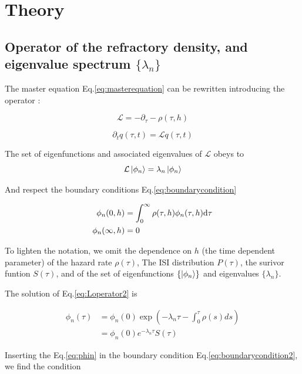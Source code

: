 \documentclass[a4paper,11pt,twoside]{article}
\def \dd  {{\rm d}}
\numberwithin{equation}{section}
\begin{document}
\section{Theory}
\label{sec:theory}
\subsection{Operator of the refractory density, and eigenvalue spectrum $\{\lambda_n\}$}

The master equation Eq.\eqref{eq:masterequation} can be rewritten introducing the operator :

\begin{equation}
\label{eq:Loperator}
\mathcal{L}=-\partial_\tau-\rho(\tau,h)
\end{equation}

\begin{equation}
\label{eq:masterequation2}
\partial_t q(\tau,t)=\mathcal{L}q(\tau,t)
\end{equation}

The set of eigenfunctions and associated eigenvalues of $\mathcal{L}$ obeys to
\begin{equation}
\label{eq:Loperator2}
\mathcal{L}\ket{\phi_n}=\lambda_n\ket{\phi_n}
\end{equation}

And respect the boundary conditions Eq.\eqref{eq:boundarycondition}

\begin{align}
\label{eq:boundarycondition2}
\phi_n(0,h)&=\int_0^\infty\rho(\tau,h)\phi_n(\tau,h)\dd\tau\\
\phi_n(\infty,h)&=0\\
\end{align}


 To lighten the notation, we omit the dependence on $h$ (the time dependent parameter) of the hazard rate $\rho(\tau)$, The ISI distribution $P(\tau)$, the surivor funtion $S(\tau)$, and of the set of eigenfunctions $\{\ket{\phi_n}\}$ and eigenvalues $\{\lambda_n\}$.

The solution of Eq.\eqref{eq:Loperator2} is

\begin{align}
\label{eq:phin}
\phi_n(\tau)&=\phi_n(0)\exp(-\lambda_n\tau-\int_0^\tau\rho(s)ds)\nonumber\\
&=\phi_n(0)e^{-\lambda_n\tau}S(\tau)
\end{align}

Inserting the Eq.\eqref{eq:phin} in the boundary condition Eq.\eqref{eq:boundarycondition2}, we find the condition
\end{document}
